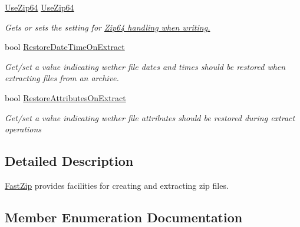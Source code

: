 \begin{DoxyCompactItemize}
\hyperlink{namespace_i_c_sharp_code_1_1_sharp_zip_lib_1_1_zip_aaa66f18625e7ce19069972caf7bc69a0}{Use\+Zip64} \hyperlink{class_i_c_sharp_code_1_1_sharp_zip_lib_1_1_zip_1_1_fast_zip_ac4e6307152ee6e83426c8844d9ef89ee}{Use\+Zip64}
\begin{DoxyCompactList}\small\item\em Gets or sets the setting for \hyperlink{class_i_c_sharp_code_1_1_sharp_zip_lib_1_1_zip_1_1_fast_zip_ac4e6307152ee6e83426c8844d9ef89ee}{Zip64 handling when writing.} \end{DoxyCompactList}\item 
bool \hyperlink{class_i_c_sharp_code_1_1_sharp_zip_lib_1_1_zip_1_1_fast_zip_a3c868c58e0d05aeb9a96cdad2719d3f5}{Restore\+Date\+Time\+On\+Extract}
\begin{DoxyCompactList}\small\item\em Get/set a value indicating wether file dates and times should be restored when extracting files from an archive. \end{DoxyCompactList}\item 
bool \hyperlink{class_i_c_sharp_code_1_1_sharp_zip_lib_1_1_zip_1_1_fast_zip_a2650aa68c6f4ee5e292274d99a2826fd}{Restore\+Attributes\+On\+Extract}
\begin{DoxyCompactList}\small\item\em Get/set a value indicating wether file attributes should be restored during extract operations \end{DoxyCompactList}\end{DoxyCompactItemize}


\subsection{Detailed Description}
\hyperlink{class_i_c_sharp_code_1_1_sharp_zip_lib_1_1_zip_1_1_fast_zip}{Fast\+Zip} provides facilities for creating and extracting zip files. 



\subsection{Member Enumeration Documentation}
\mbox{\label{class_i_c_sharp_code_1_1_sharp_zip_lib_1_1_zip_1_1_fast_zip_a9befc960dd9a0ca2645a8677f77f6e8c}} 
